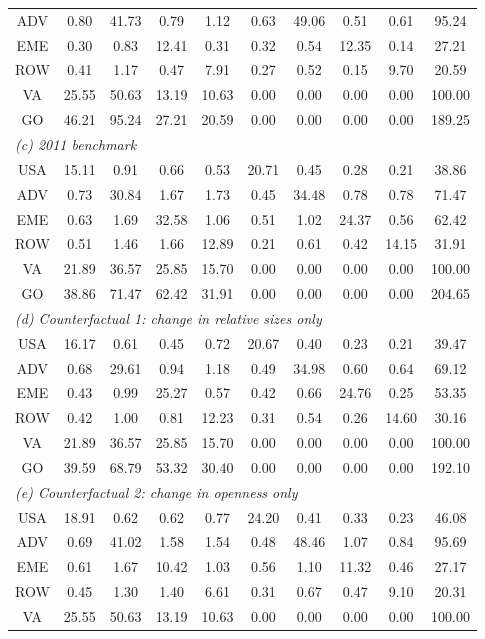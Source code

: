 \begin{table}[p]
\begin{center}
\begin{threeparttable}
\begin{tabular}{cccccccccc}
ADV& 0.80& 41.73& 0.79& 1.12& 0.63& 49.06& 0.51& 0.61& 95.24 \\
EME& 0.30& 0.83& 12.41& 0.31& 0.32& 0.54& 12.35& 0.14& 27.21 \\
ROW& 0.41& 1.17& 0.47& 7.91& 0.27& 0.52& 0.15& 9.70& 20.59 \\
VA& 25.55& 50.63& 13.19& 10.63& 0.00& 0.00& 0.00& 0.00& 100.00\\
GO& 46.21& 95.24& 27.21& 20.59& 0.00& 0.00& 0.00& 0.00& 189.25\\
\midrule
\multicolumn{10}{l}{\textit{(c) 2011 benchmark}}\\
USA& 15.11& 0.91& 0.66& 0.53& 20.71& 0.45& 0.28& 0.21& 38.86 \\
ADV& 0.73& 30.84& 1.67& 1.73& 0.45& 34.48& 0.78& 0.78& 71.47 \\
EME& 0.63& 1.69& 32.58& 1.06& 0.51& 1.02& 24.37& 0.56& 62.42 \\
ROW& 0.51& 1.46& 1.66& 12.89& 0.21& 0.61& 0.42& 14.15& 31.91 \\
VA& 21.89& 36.57& 25.85& 15.70& 0.00& 0.00& 0.00& 0.00& 100.00\\
GO& 38.86& 71.47& 62.42& 31.91& 0.00& 0.00& 0.00& 0.00& 204.65\\
\midrule
\multicolumn{10}{l}{\textit{(d) Counterfactual 1: change in relative sizes only}}\\
USA& 16.17& 0.61& 0.45& 0.72& 20.67& 0.40& 0.23& 0.21& 39.47 \\
ADV& 0.68& 29.61& 0.94& 1.18& 0.49& 34.98& 0.60& 0.64& 69.12 \\
EME& 0.43& 0.99& 25.27& 0.57& 0.42& 0.66& 24.76& 0.25& 53.35 \\
ROW& 0.42& 1.00& 0.81& 12.23& 0.31& 0.54& 0.26& 14.60& 30.16 \\
VA& 21.89& 36.57& 25.85& 15.70& 0.00& 0.00& 0.00& 0.00& 100.00\\
GO& 39.59& 68.79& 53.32& 30.40& 0.00& 0.00& 0.00& 0.00& 192.10\\
\midrule
\multicolumn{10}{l}{\textit{(e) Counterfactual 2: change in openness only}}\\
USA& 18.91& 0.62& 0.62& 0.77& 24.20& 0.41& 0.33& 0.23& 46.08 \\
ADV& 0.69& 41.02& 1.58& 1.54& 0.48& 48.46& 1.07& 0.84& 95.69 \\
EME& 0.61& 1.67& 10.42& 1.03& 0.56& 1.10& 11.32& 0.46& 27.17 \\
ROW& 0.45& 1.30& 1.40& 6.61& 0.31& 0.67& 0.47& 9.10& 20.31 \\
VA& 25.55& 50.63& 13.19& 10.63& 0.00& 0.00& 0.00& 0.00& 100.00\\

\end{tabular}
\end{threeparttable}
\end{center}
\end{table}

